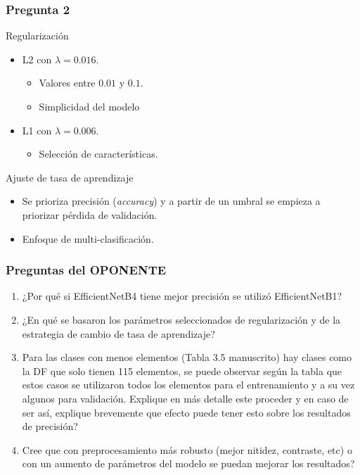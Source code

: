 \documentclass{beamer}
\begin{document}
\begin{frame}
  \frametitle{Pregunta 2}
  \begin{block}{Regularización}
    \begin{itemize}
      \item L2 con $\lambda = 0.016$.
      \begin{itemize}
        \item Valores entre $0.01$ y $0.1$.
        \item Simplicidad del modelo
      \end{itemize} 
      \item L1 con $\lambda = 0.006$.
      \begin{itemize}
        \item Selección de características.
      \end{itemize}
    \end{itemize}
  \end{block}

  \begin{block}{Ajuste de tasa de aprendizaje}
    \begin{itemize}
      \item Se prioriza precisión (\textit{accuracy}) y a partir de un umbral se empieza a priorizar pérdida de validación.
      \item Enfoque de multi-clasificación.
    \end{itemize}
    
  \end{block}
\end{frame}

\begin{frame}
  \frametitle{Preguntas del OPONENTE}

      \begin{enumerate}
        \item<0-> ¿Por qué si EfficientNetB4 tiene mejor precisión se utilizó EfficientNetB1?
        \item<0-> ¿En qué se basaron los parámetros seleccionados de regularización y de la estrategia de cambio de tasa de aprendizaje?
        \item<0-> Para las clases con menos elementos (Tabla 3.5 manuscrito) hay clases como la DF que solo tienen 115 elementos, se puede observar según la tabla que estos casos se utilizaron todos los elementos para el entrenamiento y a su vez algunos para validación. Explique en más detalle este proceder  y en caso de ser así, explique brevemente que efecto puede tener esto sobre los resultados de precisión?
        \item<0> Cree que con preprocesamiento más robusto (mejor nitidez, contraste, etc) o con un aumento de parámetros del modelo se puedan mejorar los resultados?
      \end{enumerate}
\end{frame}
\end{document}
